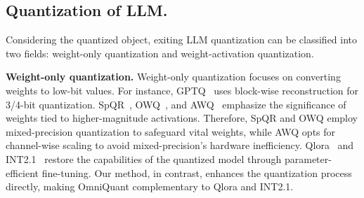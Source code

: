 \documentclass{article} %
\begin{document}

\subsection{Quantization of LLM.}
Considering the quantized object, exiting LLM quantization can be classified into two fields: weight-only quantization and weight-activation quantization. 

\textbf{Weight-only quantization.} Weight-only quantization focuses on converting weights to low-bit values. For instance, GPTQ~\citep{gptq} uses block-wise reconstruction for 3/4-bit quantization. SpQR~\citep{spqr}, OWQ~\citep{owq}, and AWQ~\citep{awq} emphasize the significance of weights tied to higher-magnitude activations.  Therefore, SpQR and OWQ employ mixed-precision quantization to safeguard vital weights, while AWQ opts for channel-wise scaling to avoid mixed-precision's hardware inefficiency. 
Qlora~\citep{qlora} and INT2.1~\citep{quip} restore the capabilities of the quantized model through parameter-efficient fine-tuning. Our method, in contrast, enhances the quantization process directly, making OmniQuant complementary to Qlora and INT2.1.
\end{document}
